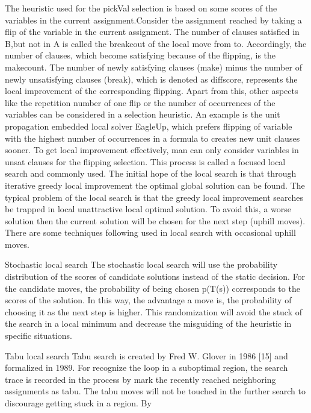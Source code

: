 \documentclass[12pt,a4paper,twoside]{scrartcl}
\numberwithin{equation}{section}
\begin{document}
The heuristic used for the pickVal selection is based on some scores of the variables in the current assignment.Consider the assignment reached by taking a flip of the variable in the current assignment. The number of clauses satisfied in B,but not in A is called the breakcout of the local move from to. Accordingly, the number of clauses, which become satisfying because of the flipping, is the makecount. The number of newly satisfying clauses (make) minus the number of newly unsatisfying clauses (break), which is denoted as diffscore, represents the local improvement of the corresponding flipping. Apart from this, other aspects like the repetition number of one flip or the number of occurrences of the variables can be considered in a selection heuristic.
An example is the unit propagation embedded local solver EagleUp, which prefers flipping of variable with the highest number of occurrences in a formula to creates new unit clauses sooner. To get local improvement effectively, man can only consider variables in unsat clauses for the flipping selection. This process is called a focused local search and commonly used. 
The initial hope of the local search is that through iterative greedy local improvement the optimal global solution can be found.  The typical problem of the local search is that the greedy local improvement searches be trapped in local unattractive local optimal solution.  To avoid this, a worse solution then the current solution will be chosen for the next step (uphill moves). There are some techniques following used in local search with occasional uphill moves.

Stochastic local search
The stochastic local search will use the probability distribution of the scores of candidate solutions instead of the static decision. For the candidate moves, the probability of being chosen p(T(s)) corresponds to the scores of the solution. In this way, the advantage a move is, the probability of choosing it as the next step is higher.   This randomization will avoid the stuck of the search in a local minimum and decrease the misguiding of the heuristic in specific situations. 

Tabu local search 
 Tabu search is created by Fred W. Glover in 1986 [15] and formalized in 1989.  For recognize the loop in a suboptimal region, the search trace is recorded in the process by mark the recently reached neighboring assignments as tabu. The tabu moves will not be touched in the further search to discourage getting stuck in a region. By 
\end{document}
